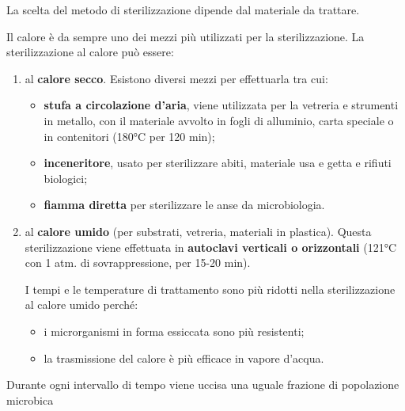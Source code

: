 \documentclass[11pt]{book}
\begin{document}
La scelta del metodo di sterilizzazione dipende dal materiale da trattare. 

Il calore è da sempre uno dei mezzi più utilizzati per la sterilizzazione. La sterilizzazione al calore può essere:
\begin{enumerate} 
\item al \textbf{calore secco}. Esistono diversi mezzi per effettuarla tra cui:
\begin{itemize}
\item \textbf{stufa a circolazione d’aria}, viene utilizzata per la vetreria e strumenti in metallo, con il materiale avvolto in fogli di alluminio, carta speciale o in contenitori (180°C per 120 min);
\item \textbf{inceneritore}, usato per sterilizzare abiti, materiale usa e getta e rifiuti biologici;
\item \textbf{fiamma diretta} per sterilizzare le anse da microbiologia.
\end{itemize} 

\item al \textbf{calore umido} (per substrati, vetreria, materiali in plastica). Questa sterilizzazione viene effettuata in \textbf{autoclavi verticali o orizzontali} (121°C con 1 atm. di sovrappressione, per 15-20 min).

I tempi e le temperature di trattamento sono più ridotti nella sterilizzazione al calore umido perché:
\begin{itemize}
\item i microrganismi in forma essiccata sono più resistenti;
\item la trasmissione del calore è più efficace in vapore d’acqua.
\end{itemize}

\end{enumerate}

Durante ogni intervallo di tempo viene uccisa una uguale frazione di popolazione microbica
\end{document}
